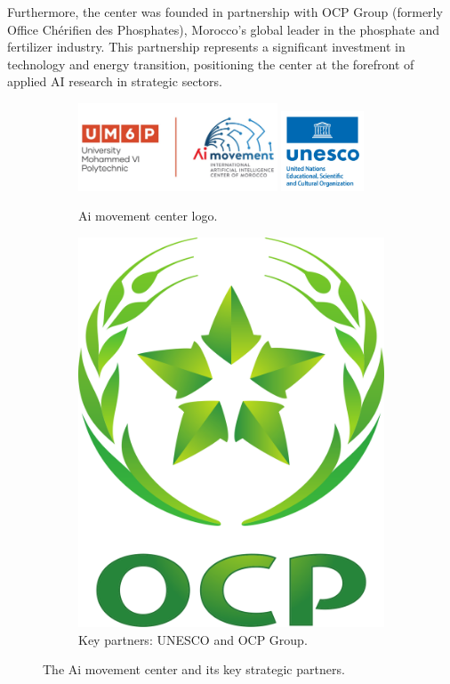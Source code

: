 \documentclass[../Main.tex]{subfiles}
\begin{document}
Furthermore, the center was founded in partnership with OCP Group (formerly Office Chérifien des Phosphates), Morocco's global leader in the phosphate and fertilizer industry. This partnership represents a significant investment in technology and energy transition, positioning the center at the forefront of applied AI research in strategic sectors.


\begin{figure}[H]
    \centering
    \begin{subfigure}[b]{0.7\textwidth}
        \centering
        \includegraphics[width=0.65\textwidth]{img/logo/aim-um6p.jpeg}
        \includegraphics[width=0.27\textwidth]{img/logo/unesco.jpeg}
        \caption{Ai movement center logo.}
    \end{subfigure}
    \begin{subfigure}[b]{0.25\textwidth}
        \centering
        \includegraphics[width=0.5\linewidth]{img/logo/ocp.png}
        \caption{Key partners: UNESCO and OCP Group.}
    \end{subfigure}
    \caption{The Ai movement center and its key strategic partners.}
    \label{fig:aim_partners}
\end{figure}
\end{document}
